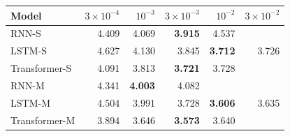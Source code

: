 \begin{tabular}{@{}lrrrrr@{}}
\toprule
Model & $3{\times}10^{-4}$ & $10^{-3}$ & $3{\times}10^{-3}$ & $10^{-2}$ & $3{\times}10^{-2}$ \\
\midrule
RNN-S & 4.409 & 4.069 & \textbf{3.915} & 4.537 &  \\
LSTM-S & 4.627 & 4.130 & 3.845 & \textbf{3.712} & 3.726 \\
Transformer-S & 4.091 & 3.813 & \textbf{3.721} & 3.728 &  \\
RNN-M & 4.341 & \textbf{4.003} & 4.082 &  &  \\
LSTM-M & 4.504 & 3.991 & 3.728 & \textbf{3.606} & 3.635 \\
Transformer-M & 3.894 & 3.646 & \textbf{3.573} & 3.640 &  \\
\bottomrule
\end{tabular}
